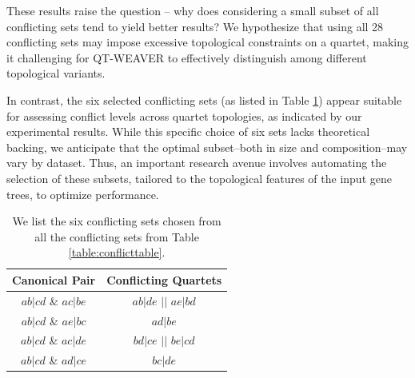 \documentclass[runningheads]{llncs}
\begin{document}
\begin{appendices}
These results raise the question -- why does considering a small subset of all conflicting sets tend to yield better results? We hypothesize that using all 28 conflicting sets may impose excessive topological constraints on a quartet, making it challenging for QT-WEAVER to effectively distinguish among different topological variants.

In contrast, the six selected conflicting sets (as listed in Table \ref{table:conflicttable_six}) appear suitable for assessing conflict levels across quartet topologies, as indicated by our experimental results. While this specific choice of six sets lacks theoretical backing, we anticipate that the optimal subset--both in size and composition--may vary by dataset. Thus, an important research avenue involves automating the selection of these subsets, tailored to the topological features of the input gene trees, to optimize performance.

\begin{table}[h!]
    \centering
     \renewcommand{\arraystretch}{1.2}
    \begin{tabular}{|c|c|}
        \hline
        \textbf{Canonical Pair} & \textbf{Conflicting Quartets} \\ \hline

        $ab|cd$ \& $ac|be$ 
        & $ab|de$ $||$ $ae|bd$\\ \hline

        $ab|cd$ \& $ae|bc$ 
        & $ad|be$\\ \hline

        $ab|cd$ \& $ac|de$ 
        & $bd|ce$ $||$ $be|cd$\\ \hline

        $ab|cd$ \& $ad|ce$ 
        & $bc|de$\\ \hline
        
    \end{tabular}
    \caption{We list the six conflicting sets chosen from all the conflicting sets from Table \ref{table:conflicttable}.}
    \label{table:conflicttable_six}
\end{table}






\end{appendices}
\end{document}
